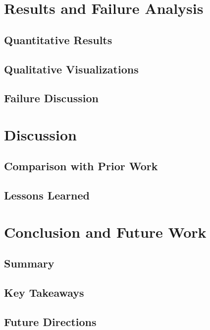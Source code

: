 \documentclass[a4paper,12pt]{article}
\begin{document}
\section{Results and Failure Analysis}
\subsection{Quantitative Results}


\subsection{Qualitative Visualizations}


\subsection{Failure Discussion}


\section{Discussion}
\subsection{Comparison with Prior Work}


\subsection{Lessons Learned}


\section{Conclusion and Future Work}
\subsection{Summary}


\subsection{Key Takeaways}


\subsection{Future Directions}


\clearpage

\appendix

\end{document}
